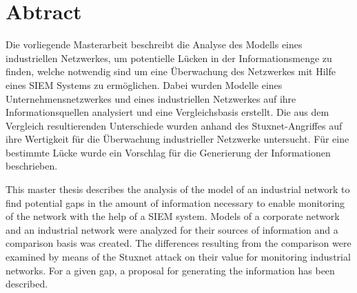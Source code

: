 \pagestyle{empty} %


\chapter*{Abtract} %
\label{cha: abtract}


Die vorliegende Masterarbeit beschreibt die Analyse des Modells eines industriellen Netzwerkes, um potentielle Lücken in der Informationsmenge zu finden, welche notwendig sind um eine Überwachung des Netzwerkes mit Hilfe eines SIEM Systems zu ermöglichen. Dabei wurden Modelle eines Unternehmensnetzwerkes und eines industriellen Netzwerkes auf ihre Informationsquellen analysiert und eine Vergleichsbasis erstellt. Die aus dem Vergleich resultierenden Unterschiede wurden anhand des Stuxnet-Angriffes auf ihre Wertigkeit für die Überwachung industrieller Netzwerke untersucht. Für eine bestimmte Lücke wurde ein Vorschlag für die Generierung der Informationen beschrieben. 

\vspace{60 pt}

\noindent This master thesis describes the analysis of the model of an industrial network to find potential gaps in the amount of information necessary to enable monitoring of the network with the help of a SIEM system. Models of a corporate network and an industrial network were analyzed for their sources of information and a comparison basis was created. The differences resulting from the comparison were examined by means of the Stuxnet attack on their value for monitoring industrial networks. For a given gap, a proposal for generating the information has been described.


